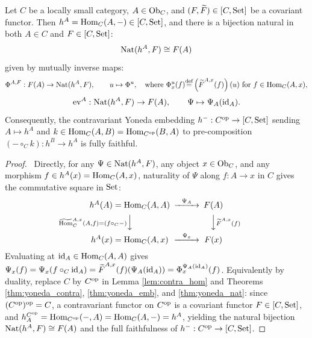 \documentclass[10pt,a4paper]{article}
\renewcommand{\myprf}{\begin{proof}}
\renewcommand{\myqed}{\end{proof}}
\begin{document}
\begin{theorem}\label{thm:yoneda_cov}
Let $C$ be a locally small category, $A \in {\textrm{Ob}}_C$, and $(F, {\widetilde{F}\textrm{}}) \in [C, {\textrm{Set}}]$ be a covariant functor. Then $h^A = {\textrm{Hom}}_C(A, -) \in [C, {\textrm{Set}}]$, and there is a bijection natural in both $A \in C$ and $F \in [C, {\textrm{Set}}]$:
$${\textrm{Nat}}(h^A, F) \cong F(A)$$
given by mutually inverse maps:
$$\Phi^{A,F} : F(A) \to {\textrm{Nat}}(h^A, F), \qquad u \mapsto \Phi^u, \quad \textrm{where } \Phi^u_x(f) {\stackrel{{\textrm{def}}}{=}} \left({\widetilde{F}\textrm{}}^{A,x}(f)\right)(u) \textrm{ for } f \in {\textrm{Hom}}_C(A,x),$$
$$\mathrm{ev}^A : {\textrm{Nat}}(h^A, F) \to F(A), \qquad \Psi \mapsto \Psi_A({\textrm{id}}_A).$$
Consequently, the contravariant Yoneda embedding $h^- : C^{\textrm{op}} \to [C, {\textrm{Set}}]$ sending $A \mapsto h^A$ and $k \in {\textrm{Hom}}_C(A,B) = {\textrm{Hom}}_{C^{\textrm{op}}}(B,A)$ to pre-composition $(- \circ_C k) : h^B \to h^A$ is fully faithful.
\end{theorem}
\myprf\ Directly, for any $\Psi \in {\textrm{Nat}}(h^A, F)$, any object $x \in {\textrm{Ob}}_C$, and any morphism $f \in h^A(x) = {\textrm{Hom}}_C(A,x)$, naturality of $\Psi$ along $f : A \to x$ in $C$ gives the commutative square in ${\textrm{Set}}$:
$$\begin{CD}
h^A(A) = \Hom_C(A,A) @>{\Psi_A}>> F(A) \\
@V{\HomMor_C^{A,x}(A,f) = (f \circ_C -)}VV @VV{\FMor^{A,x}(f)}V \\
h^A(x) = \Hom_C(A,x) @>{\Psi_x}>> F(x)
\end{CD}$$
Evaluating at ${\textrm{id}}_A \in {\textrm{Hom}}_C(A,A)$ gives $\Psi_x(f) = \Psi_x(f \circ_C {\textrm{id}}_A) = {\widetilde{F}\textrm{}}^{A,x}(f)(\Psi_A({\textrm{id}}_A)) = \Phi^{\Psi_A({\textrm{id}}_A)}_x(f)$. Equivalently by duality, replace $C$ by $C^{\textrm{op}}$ in Lemma \ref{lem:contra_hom} and Theorems \ref{thm:yoneda_contra}, \ref{thm:yoneda_emb}, and \ref{thm:yoneda_nat}: since $(C^{\textrm{op}})^{\textrm{op}} = C$, a contravariant functor on $C^{\textrm{op}}$ is a covariant functor $F \in [C, {\textrm{Set}}]$, and $h_A^{C^{\textrm{op}}} = {\textrm{Hom}}_{C^{\textrm{op}}}(-, A) = {\textrm{Hom}}_C(A, -) = h^A$, yielding the natural bijection ${\textrm{Nat}}(h^A, F) \cong F(A)$ and the full faithfulness of $h^- : C^{\textrm{op}} \to [C, {\textrm{Set}}]$. \myqed
\end{document}
